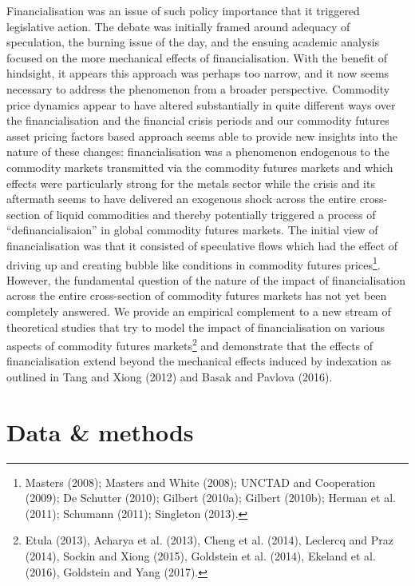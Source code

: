 \documentclass[]{elsarticle} %
\begin{document}
Financialisation was an issue of such policy importance that it triggered legislative action. The debate was initially framed around adequacy of speculation, the burning issue of the day, and the ensuing academic analysis focused on the more mechanical effects of financialisation. With the benefit of hindsight, it appears this approach was perhaps too narrow, and it now seems necessary to address the phenomenon from a broader perspective. Commodity price dynamics appear to have altered substantially in quite different ways over the financialisation and the financial crisis periods and our commodity futures asset pricing factors based approach seems able to provide new insights into the nature of these changes: financialisation was a phenomenon endogenous to the commodity markets transmitted via the commodity futures markets and which effects were particularly strong for the metals sector while the crisis and its aftermath seems to have delivered an exogenous shock across the entire cross-section of liquid commodities and thereby potentially triggered a process of ``definancialisaion'' in global commodity futures markets. The initial view of financialisation was that it consisted of speculative flows which had the effect of driving up and creating bubble like conditions in commodity futures prices\footnote{Masters (2008); Masters and White (2008); UNCTAD and Cooperation (2009); De Schutter (2010); Gilbert (2010a); Gilbert (2010b); Herman et al. (2011); Schumann (2011); Singleton (2013).}. However, the fundamental question of the nature of the impact of financialisation across the entire cross-section of commodity futures markets has not yet been completely answered. We provide an empirical complement to a new stream of theoretical studies that try to model the impact of financialisation on various aspects of commodity futures markets\footnote{Etula (2013), Acharya et al. (2013), Cheng et al. (2014), Leclercq and Praz (2014), Sockin and Xiong (2015), Goldstein et al. (2014), Ekeland et al. (2016), Goldstein and Yang (2017).} and demonstrate that the effects of financialisation extend beyond the mechanical effects induced by indexation as outlined in Tang and Xiong (2012) and Basak and Pavlova (2016).

\cleardoublepage

\hypertarget{co-movement-data-methods}{%
\section{Data \& methods}\label{co-movement-data-methods}}
\end{document}
